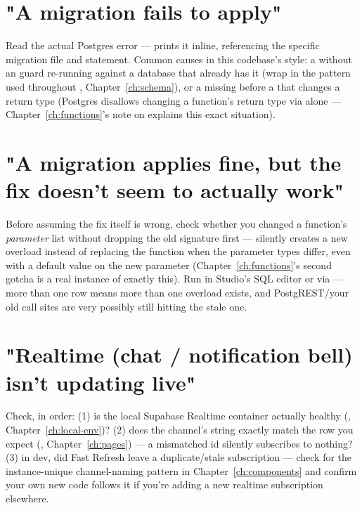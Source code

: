 \section*{"A migration fails to apply"}
\begin{olkhowto}
Read the actual Postgres error —  prints it inline, referencing the specific migration file and statement. Common causes in this codebase's style: a  without an  guard re-running against a database that already has it (wrap in the  pattern used throughout , Chapter~\ref{ch:schema}), or a  missing before a  that changes a return type (Postgres disallows changing a function's return type via  alone — Chapter~\ref{ch:functions}'s note on  explains this exact situation).
\end{olkhowto}

\section*{"A migration applies fine, but the fix doesn't seem to actually work"}
Before assuming the fix itself is wrong, check whether you changed a function's \emph{parameter} list without dropping the old signature first —  silently creates a new overload instead of replacing the function when the parameter types differ, even with a default value on the new parameter (Chapter~\ref{ch:functions}'s second  gotcha is a real instance of exactly this). Run  in Studio's SQL editor or via  — more than one row means more than one overload exists, and PostgREST/your old call sites are very possibly still hitting the stale one.

\section*{"Realtime (chat / notification bell) isn't updating live"}
Check, in order: (1) is the local Supabase Realtime container actually healthy (, Chapter~\ref{ch:local-env})? (2) does the channel's  string exactly match the row you expect (, Chapter~\ref{ch:pages}) — a mismatched id silently subscribes to nothing? (3) in dev, did Fast Refresh leave a duplicate/stale subscription — check for the instance-unique channel-naming pattern in Chapter~\ref{ch:components} and confirm your own new code follows it if you're adding a new realtime subscription elsewhere.

